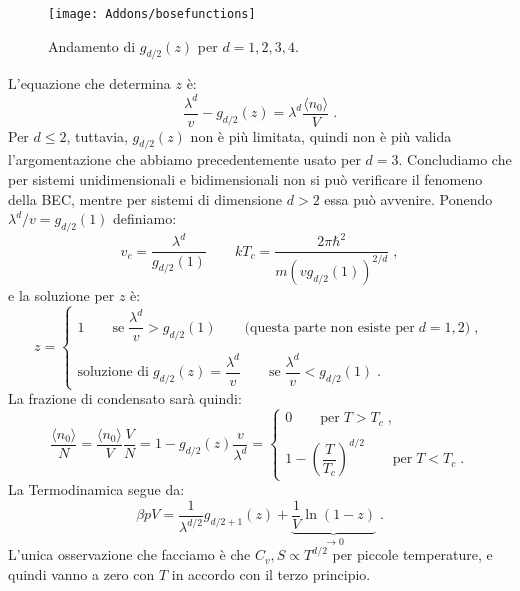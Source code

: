 \documentclass[10pt,a4paper]{report}
\theoremstyle{definition}
\numberwithin{equation}{section}
\newcommand{\bra}{\langle}
\newcommand{\ket}{\rangle}
\begin{document}
\begin{figure}[h]
\centering
\texttt{[image: Addons/bosefunctions]}
\caption{\footnotesize{Andamento di $g_{d/2}(z)$ per $d=1,2,3,4$.}}
\end{figure}
\pagebreak
L'equazione che determina $z$ è:
\begin{equation}
\frac{\lambda^d}{v}-g_{d/2}(z)=\lambda^d\frac{\bra n_0\ket}{V}\;.
\end{equation}
Per $d\le 2$, tuttavia, $g_{d/2}(z)$ non è più limitata, quindi non è più valida l'argomentazione che abbiamo precedentemente usato per $d=3$. Concludiamo che per sistemi unidimensionali e bidimensionali non si può verificare il fenomeno della BEC, mentre per sistemi di dimensione $d>2$ essa può avvenire. Ponendo $\lambda^d/v=g_{d/2}(1)$ definiamo:
\begin{equation}
v_c=\frac{\lambda^d}{g_{d/2}(1)}\qquad kT_c=\frac{2\pi\hbar^2}{m(vg_{d/2}(1))^{2/d}}\;,
\end{equation}
e la soluzione per $z$ è:
\begin{equation}
z=\begin{cases}
1\qquad \mbox{se}\; \dfrac{\lambda^d}{v}>g_{d/2}(1)\qquad \mbox{(questa parte non esiste per}\; d=1,2)\;, \\
\\
\mbox{soluzione di}\; g_{d/2}(z)=\dfrac{\lambda^d}{v}\qquad \mbox{se}\; \dfrac{\lambda^d}{v}<g_{d/2}(1)\;.
\end{cases}
\end{equation}
La frazione di condensato sarà quindi:
\begin{equation}
\frac{\bra n_0\ket}{N}=\frac{\bra n_0\ket}{V}\frac{V}{N}=1-g_{d/2}(z)\frac{v}{\lambda^d}=\begin{cases}
0\qquad \mbox{per}\; T>T_c\;, \\
\\
1-\left(\dfrac{T}{T_c}\right)^{d/2}\qquad \mbox{per}\; T<T_c\;.
\end{cases}
\end{equation}
La Termodinamica segue da:
$$
\beta pV=\frac{1}{\lambda^{d/2}}g_{d/2+1}(z)+\underbrace{\frac{1}{V}\ln(1-z)}_{\to 0}\;.
$$
L'unica osservazione che facciamo è che $C_v,S\propto T^{d/2}$ per piccole temperature, e quindi vanno a zero con $T$ in accordo con il terzo principio.
\end{document}
